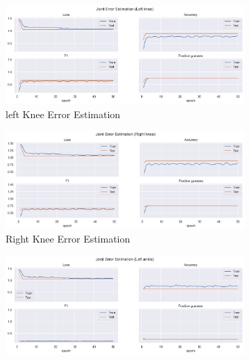   
  \begin{figure}[!htbp]
    \centering
    \begin{subfigure}[b]{0.47\linewidth}
        \centering
        \includegraphics[width=\textwidth]{figures/Results/v2/jt/Left knee_ErrorEstimation.png}
        \caption{left Knee Error Estimation}
        \label{fig:v2_lekn_jt_ee}
    \end{subfigure}
    \hfill
    \begin{subfigure}[b]{0.47\linewidth}
        \centering
        \includegraphics[width=\textwidth]{figures/Results/v2/jt/Right knee_ErrorEstimation.png}
        \caption{Right Knee Error Estimation}
        \label{fig:v2_rikn_jt_ee}
    \end{subfigure}
    \hfill
    \begin{subfigure}[b]{0.47\linewidth}
        \centering
        \includegraphics[width=\textwidth]{figures/Results/v2/jt/Left ankle_ErrorEstimation.png}

\end{subfigure}
\end{figure}
